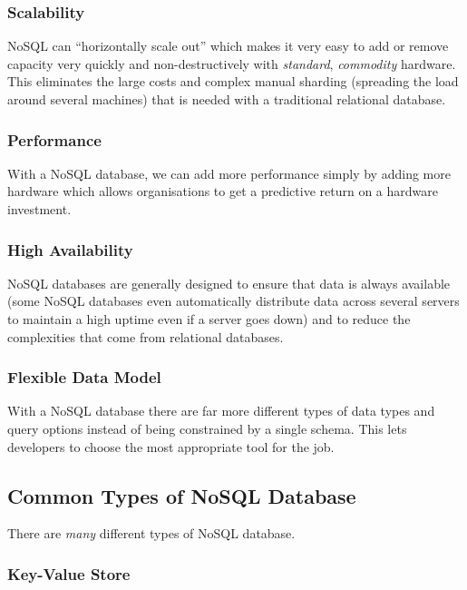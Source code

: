 \subsubsection{Scalability}\label{ssub:scalibility}

NoSQL can ``horizontally scale out'' which makes it very easy to add or remove capacity very quickly and non-destructively with \emph{standard}, \emph{commodity} hardware.
This eliminates the large costs and complex manual sharding (spreading the load around several machines) that is needed with a traditional relational database.

\subsubsection{Performance}\label{ssub:performance}

With a NoSQL database, we can add more performance simply by adding more hardware which allows organisations to get a predictive return on a hardware investment.

\subsubsection{High Availability}\label{ssub:high_availability}

NoSQL databases are generally designed to ensure that data is always available (some NoSQL databases even automatically distribute data across several servers to maintain a high uptime even if a server goes down) and to reduce the complexities that come from relational databases.

\subsubsection{Flexible Data Model}\label{ssub:flexible_data_model}

With a NoSQL database there are far more different types of data types and query options instead of being constrained by a single schema.
This lets developers to choose the most appropriate tool for the job.

\subsection{Common Types of NoSQL Database}\label{sub:common_types_of_nosql_database}

There are \emph{many} different types of NoSQL database.

\subsubsection{Key-Value Store}\label{ssub:key_value_store}

